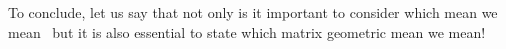 \documentclass{article}
\begin{document}
To conclude, let us say that not only  is it important to consider which mean we mean~\cite{de2016mean} 
but it is also essential to state which matrix geometric mean we mean!

%
%
%




\end{document}
